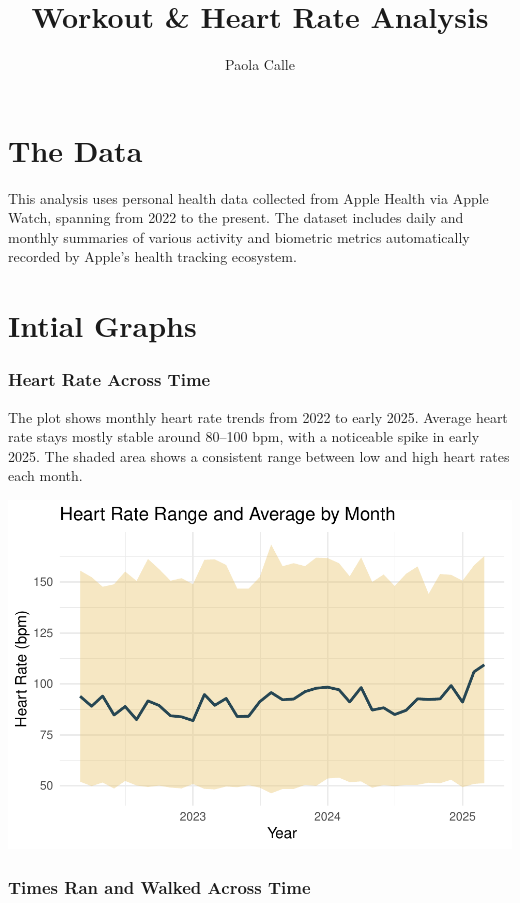 \documentclass[
  11pt,
]{article}
\title{Workout \& Heart Rate Analysis}
\author{Paola Calle}
\date{}
\begin{document}
\maketitle

{
\setcounter{tocdepth}{2}
\tableofcontents
}
\section{The Data}\label{the-data}

This analysis uses personal health data collected from Apple Health via
Apple Watch, spanning from 2022 to the present. The dataset includes
daily and monthly summaries of various activity and biometric metrics
automatically recorded by Apple's health tracking ecosystem.

\section{Intial Graphs}\label{intial-graphs}

\subsubsection{Heart Rate Across Time}\label{heart-rate-across-time}

The plot shows monthly heart rate trends from 2022 to early 2025.
Average heart rate stays mostly stable around 80--100 bpm, with a
noticeable spike in early 2025. The shaded area shows a consistent range
between low and high heart rates each month.

\includegraphics{analysis_files/figure-latex/unnamed-chunk-5-1.pdf}

\subsubsection{Times Ran and Walked Across
Time}\label{times-ran-and-walked-across-time}
\end{document}
